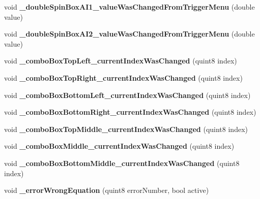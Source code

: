 \begin{DoxyCompactItemize}
void {\bfseries \+\_\+double\+Spin\+Box\+A\+I1\+\_\+value\+Was\+Changed\+From\+Trigger\+Menu} (double value)
\item 
\mbox{\label{class_trigger_window_aea5ca67ff51d32530ce2e828ae26296d}} 
void {\bfseries \+\_\+double\+Spin\+Box\+A\+I2\+\_\+value\+Was\+Changed\+From\+Trigger\+Menu} (double value)
\item 
\mbox{\label{class_trigger_window_aca4ce0218c9307292cc295ff33ba59ee}} 
void {\bfseries \+\_\+combo\+Box\+Top\+Left\+\_\+current\+Index\+Was\+Changed} (quint8 index)
\item 
\mbox{\label{class_trigger_window_a5ea11421d6b76dfc48d5602f061095f0}} 
void {\bfseries \+\_\+combo\+Box\+Top\+Right\+\_\+current\+Index\+Was\+Changed} (quint8 index)
\item 
\mbox{\label{class_trigger_window_aa40fc47c7b6ae8c61c614a5bbb0fd0dd}} 
void {\bfseries \+\_\+combo\+Box\+Bottom\+Left\+\_\+current\+Index\+Was\+Changed} (quint8 index)
\item 
\mbox{\label{class_trigger_window_a21b9ac9e946bffa233e9e95de3af710c}} 
void {\bfseries \+\_\+combo\+Box\+Bottom\+Right\+\_\+current\+Index\+Was\+Changed} (quint8 index)
\item 
\mbox{\label{class_trigger_window_a0826e3160192046e6fba594b5610cc4d}} 
void {\bfseries \+\_\+combo\+Box\+Top\+Middle\+\_\+current\+Index\+Was\+Changed} (quint8 index)
\item 
\mbox{\label{class_trigger_window_aae122440384f66f5ad4809e07f4c3ba3}} 
void {\bfseries \+\_\+combo\+Box\+Middle\+\_\+current\+Index\+Was\+Changed} (quint8 index)
\item 
\mbox{\label{class_trigger_window_ab4e2f392dff446d394c8e69ec37e7794}} 
void {\bfseries \+\_\+combo\+Box\+Bottom\+Middle\+\_\+current\+Index\+Was\+Changed} (quint8 index)
\item 
\mbox{\label{class_trigger_window_af0497189b99c2be7206f25727f58a348}} 
void {\bfseries \+\_\+error\+Wrong\+Equation} (quint8 error\+Number, bool active)
\end{DoxyCompactItemize}
